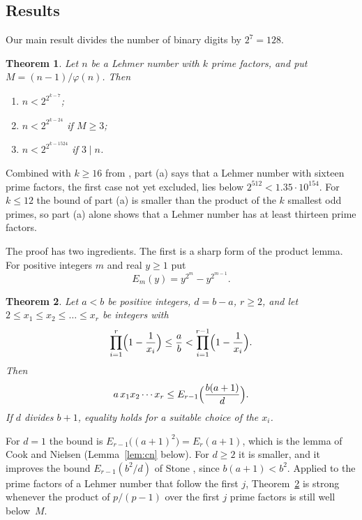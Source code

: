 \documentclass[11pt,reqno]{amsart}
\numberwithin{equation}{section}
\theoremstyle{plain}
\newtheorem{theorem}{Theorem}[section]
\theoremstyle{definition}
\theoremstyle{remark}
\begin{document}
\subsection{Results}
Our main result divides the number of binary digits by $2^7=128$.

\begin{theorem}\label{thm:main}
Let $n$ be a Lehmer number with $k$ prime factors, and put
$M=(n-1)/\varphi(n)$. Then
\begin{enumerate}[label=\textup{(\alph*)}]
\item $n<2^{2^{k-7}}$;
\item $n<2^{2^{k-24}}$ if $M\ge3$;
\item $n<2^{2^{k-1524}}$ if $3\mid n$.
\end{enumerate}
\end{theorem}

Combined with $k\ge16$ from \cite{MBB}, part (a) says that a Lehmer
number with sixteen prime factors, the first case not yet excluded,
lies below $2^{512}<1.35\cdot10^{154}$. For $k\le12$ the bound of
part (a) is smaller than the product of the $k$ smallest odd primes,
so part (a) alone shows that a Lehmer number has at least thirteen
prime factors.

The proof has two ingredients. The first is a sharp form of the
product lemma. For positive integers $m$ and real $y\ge1$ put
\[
  E_m(y)=y^{2^m}-y^{2^{m-1}} .
\]

\begin{theorem}\label{thm:deficit}
Let $a<b$ be positive integers, $d=b-a$, $r\ge2$, and let
$2\le x_1\le x_2\le\dots\le x_r$ be integers with
\begin{equation}\label{eq:hyp}
  \prod_{i=1}^{r}\Bigl(1-\frac1{x_i}\Bigr)\le\frac ab
  <\prod_{i=1}^{r-1}\Bigl(1-\frac1{x_i}\Bigr).
\end{equation}
Then
\[
  a\,x_1x_2\cdots x_r\le E_{r-1}\Bigl(\frac{b(a+1)}{d}\Bigr).
\]
If $d$ divides $b+1$, equality holds for a suitable choice of the
$x_i$.
\end{theorem}

For $d=1$ the bound is $E_{r-1}\bigl((a+1)^2\bigr)=E_r(a+1)$, which is
the lemma of Cook and Nielsen (Lemma~\ref{lem:cn} below). For $d\ge2$
it is smaller, and it improves the bound
$E_{r-1}(b^2/d)$ of Stone \cite[Corollary~1]{Sto24}, since
$b(a+1)<b^2$. Applied to the prime factors of a Lehmer number that
follow the first $j$, Theorem~\ref{thm:deficit} is strong whenever
the product of $p/(p-1)$ over the first $j$ prime factors is still
well below~$M$.
\end{document}
